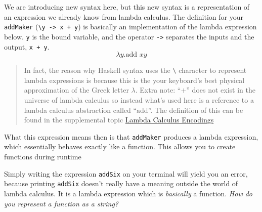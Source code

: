 \begin{Shaded}
\begin{Highlighting}[]
 \OtherTok{{-}\textgreater{}}\NormalTok{ (}\OtherTok{{-}\textgreater{}}\NormalTok{)}
\OtherTok{=}\OtherTok{{-}\textgreater{}}\OperatorTok{+}
\end{Highlighting}
\end{Shaded}

We are introducing new syntax here, but this new syntax is a
representation of an expression we already know from lambda calculus.
The definition for your \texttt{addMaker}
(\texttt{\textbackslash{}y\ -\textgreater{}\ x\ +\ y}) is basically an
implementation of the lambda expression below. \texttt{y} is the bound
variable, and the operator \texttt{-\textgreater{}} separates the inputs
and the output, \texttt{x\ +\ y}. \[
\lambda y. \text{add }x y
\]

\begin{quote}
In fact, the reason why Haskell syntax uses the
\texttt{\textbackslash{}} character to represent lambda expressions is
because this is the your keyboard's best physical approximation of the
Greek letter \(\lambda\). Extra note: ``\(+\)'' does not exist in the
universe of lambda calculus so instead what's used here is a reference
to a lambda calculus abstraction called ``\(\text{add}\)''. The
definition of this can be found in the supplemental topic
\href{www.something.com}{Lambda Calculus Encodings}
\end{quote}

What this expression means then is that \texttt{addMaker} produces a
lambda expression, which essentially behaves exactly like a function.
This allows you to create functions during runtime

\begin{Shaded}
\begin{Highlighting}[]
\OperatorTok{\textgreater{}}\OtherTok{=}
\end{Highlighting}
\end{Shaded}

Simply writing the expression \texttt{addSix} on your terminal will
yield you an error, because printing \texttt{addSix} doesn't really have
a meaning outside the world of lambda calculus. It is a lambda
expression which is \emph{basically} a function. \emph{How do you
represent a function as a string?}

